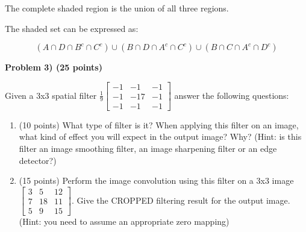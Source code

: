 \documentclass[12pt]{article}
\newcommand{\problem}[1]{%
  \vspace{0.5cm}
  {\noindent\normalsize \textbf{#1}}
  \vspace{0.3cm}
}
\begin{document}
\begin{stepbox}

The complete shaded region is the union of all three regions.

\end{stepbox}

\begin{resultsbox}

The shaded set can be expressed as:

\[
\boxed{(A \cap D \cap B^c \cap C^c) \cup (B \cap D \cap A^c \cap C^c) \cup (B \cap C \cap A^c \cap D^c)}
\]

\end{resultsbox}

\newpage


\problem{Problem 3) (25 points)}

Given a 3x3 spatial filter $\displaystyle\frac{1}{9}\begin{bmatrix} -1 & -1 & -1 \\ -1 & -17 & -1 \\ -1 & -1 & -1 \end{bmatrix}$ answer the following questions:

\begin{enumerate}
\item (10 points) What type of filter is it? When applying this filter on an image, what kind of effect you
will expect in the output image? Why? (Hint: is this filter an image smoothing filter, an
image sharpening filter or an edge detector?)

\item (15 points) Perform the image convolution using this filter on a 3x3 image $\begin{bmatrix} 3 & 5 & 12 \\ 7 & 18 & 11 \\ 5 & 9 & 15 \end{bmatrix}$. Give the
CROPPED filtering result for the output image. (Hint: you need to assume an appropriate
zero mapping)
\end{enumerate}

\vspace{0.3cm}
\end{document}
